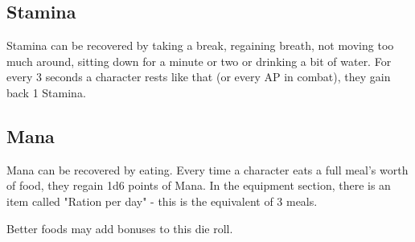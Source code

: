 \subsection{Stamina}

Stamina can be recovered by taking a break, regaining breath, not moving too much around, sitting down for a minute or two or drinking a bit of water. For every 3 seconds a character rests like that (or every AP in combat), they gain back 1 Stamina.



\subsection{Mana}

Mana can be recovered by eating. Every time a character eats a full meal's worth of food, they regain 1d6 points of Mana. In the equipment section, there is an item called "Ration per day" - this is the equivalent of 3 meals.

Better foods may add bonuses to this die roll.